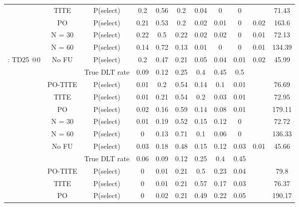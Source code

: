 \begin{table}
\begin{singlespace}
{\begin{tabular}[t]{ccccccccccc}
			& TITE & P(select) & 0.2 & 0.56 & 0.2 & 0.04 & 0 & 0 &  & 71.43\\
			
			& PO & P(select) & 0.21 & 0.53 & 0.2 & 0.02 & 0.01 & 0 & 0.02 & 163.6\\
			
			& N = 30 & P(select) & 0.22 & 0.5 & 0.22 & 0.02 & 0.02 & 0 & 0.01 & 72.13\\
			
			& N = 60 & P(select) & 0.14 & 0.72 & 0.13 & 0.01 & 0 & 0 & 0.01 & 134.39\\
			
			\multirow{-7}{*}{\centering\arraybackslash 2: TD25 @0} & No FU & P(select) & 0.2 & 0.47 & 0.21 & 0.05 & 0.04 & 0.01 & 0.02 & 45.99\\
			\cmidrule{1-11}
			\rowcolor{gray!6}   &  & True DLT rate & 0.09 & 0.12 & 0.25 & 0.4 & 0.45 & 0.5 &  & \\
			
			\rowcolor{gray!6}   & PO-TITE & P(select) & 0.01 & 0.2 & 0.54 & 0.14 & 0.1 & 0.01 &  & 76.69\\
			
			\rowcolor{gray!6}   & TITE & P(select) & 0.01 & 0.21 & 0.54 & 0.2 & 0.03 & 0.01 &  & 72.95\\
			
			\rowcolor{gray!6}   & PO & P(select) & 0.02 & 0.16 & 0.59 & 0.14 & 0.08 & 0.01 &  & 179.11\\
			
			\rowcolor{gray!6}   & N = 30 & P(select) & 0.01 & 0.19 & 0.52 & 0.15 & 0.12 & 0 &  & 72.72\\
			
			\rowcolor{gray!6}   & N = 60 & P(select) & 0 & 0.13 & 0.71 & 0.1 & 0.06 & 0 &  & 136.33\\
			
			\rowcolor{gray!6}  \multirow{-7}{*}{\centering\arraybackslash 3: TD25 @1} & No FU & P(select) & 0.03 & 0.18 & 0.48 & 0.15 & 0.12 & 0.03 & 0.01 & 45.66\\
			\cmidrule{1-11}
			&  & True DLT rate & 0.06 & 0.09 & 0.12 & 0.25 & 0.4 & 0.45 &  & \\
			
			& PO-TITE & P(select) & 0 & 0.01 & 0.21 & 0.5 & 0.23 & 0.04 &  & 79.8\\
			
			& TITE & P(select) & 0 & 0.01 & 0.21 & 0.57 & 0.17 & 0.03 &  & 76.37\\
			
			& PO & P(select) & 0 & 0.02 & 0.21 & 0.49 & 0.22 & 0.05 &  & 190.17\\
			

\end{tabular}}
\end{singlespace}
\end{table}
